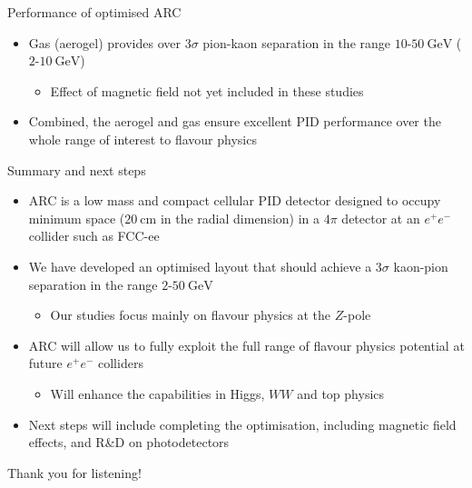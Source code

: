 \documentclass{beamer}
\begin{document}
\begin{frame}{Performance of optimised ARC}
\begin{figure}
  \end{figure}
  \vspace{-0.4cm}
  \begin{itemize}
    \setlength\itemsep{0.0em}
    \item{Gas (aerogel) provides over $3\sigma$ pion-kaon separation in the range $10$-$\SI{50}{\giga\eV}$ ($2$-$\SI{10}{\giga\eV}$)}
    \begin{itemize}
      \item{Effect of magnetic field not yet included in these studies}
    \end{itemize}
    \item{Combined, the aerogel and gas ensure excellent PID performance over the whole range of interest to flavour physics}
  \end{itemize}
\end{frame}

\begin{frame}{Summary and next steps}
  \begin{itemize}
    \setlength\itemsep{1.0em}
    \item{ARC is a low mass and compact cellular PID detector designed to occupy minimum space ($\SI{20}{\centi\meter}$ in the radial dimension) in a $4\pi$ detector at an $e^+e^-$ collider such as FCC-ee}
    \item{We have developed an optimised layout that should achieve a $3\sigma$ kaon-pion separation in the range $2$-$\SI{50}{\giga\eV}$}
    \begin{itemize}
      \item{Our studies focus mainly on flavour physics at the $Z$-pole}
    \end{itemize}
    \item{ARC will allow us to fully exploit the full range of flavour physics potential at future $e^+e^-$ colliders}
    \begin{itemize}
      \item{Will enhance the capabilities in Higgs, $WW$ and top physics}
    \end{itemize}
    \item{Next steps will include completing the optimisation, including magnetic field effects, and R\&D on photodetectors}
  \end{itemize}
  \begin{center}
    \huge Thank you for listening!
  \end{center}
\end{frame}
\end{document}
